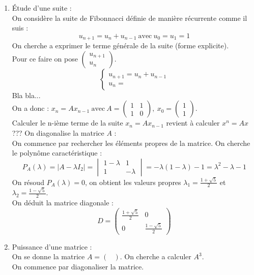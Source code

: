 \begin{ex}
\begin{enumerate}
    \item Étude d'une suite :\\
    On considère la suite de Fibonnacci définie de manière récurrente comme il suis : 
$$u_{n+1}=u_{n}+u_{n-1}\ \text{avec}\ u_0=u_1=1$$
On cherche a exprimer le terme générale de la suite (forme explicite).\\
Pour ce faire on pose $\begin{pmatrix}u_{n+1}\\u_n\end{pmatrix}$.
$$\begin{cases}u_{n+1}=u_n+u_{n-1}\\
u_n = 
\end{cases}$$ Bla bla...\\
On a donc : $x_n=Ax_{n-1}\ \text{avec}\ A=\begin{pmatrix}1&1\\1&0\end{pmatrix},\ x_0=\begin{pmatrix}1\\1\end{pmatrix}$.\\
Calculer le n-ième terme de la suite $x_n=Ax_{n-1}$ revient à calculer $x^n=Ax$ ???
On diagonalise la matrice $A$ :\\
On commence par rechercher les éléments propres de la matrice.
On cherche le polynôme caractéristique :
$$P_A(\lambda)=|A-\lambda I_2|=\begin{vmatrix}1-\lambda&1\\1&-\lambda\end{vmatrix}=-\lambda(1-\lambda)-1=\lambda^2-\lambda-1$$
On résoud $P_A(\lambda)=0$, on obtient les valeurs propres $\lambda_1=\frac{1+\sqrt{5}}{2}$ et $\lambda_2=\frac{1-\sqrt{5}}{2}$.\\
On déduit la matrice diagonale :
$$D=\begin{pmatrix}\frac{1+\sqrt{5}}{2}&0\\0&\frac{1-\sqrt{5}}{2}\end{pmatrix}$$
    \item Puissance d'une matrice :\\
On se donne la matrice $A=\begin{pmatrix}\end{pmatrix}$.
On cherche a calculer $A^3$.\\
On commence par diagonaliser la matrice.\\
\end{enumerate}
\end{ex}
